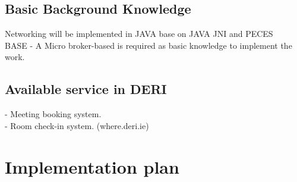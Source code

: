 \documentclass[a4paper]{llncs}
\newcommand{\head}[1]{\textnormal {\textbf{#1}}}
\begin{document}

\subsection{Basic Background Knowledge}
Networking will be implemented in JAVA base on JAVA JNI and PECES\\
BASE - A Micro broker-based is required as basic knowledge to implement the work.

\subsection{Available service in DERI}
- Meeting booking system.\\
- Room check-in system. (where.deri.ie)



\section{Implementation plan}



\end{document}
